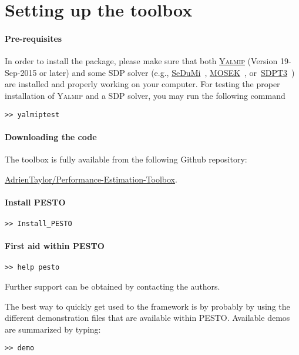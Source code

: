 \documentclass[11pt,a4paper]{article}
\newcommand{\pesto}{{PESTO }}
\begin{document}
\clearpage
\section{Setting up the toolbox}		%


\paragraph{Pre-requisites} In order to install the package, please make sure that both \href{https://yalmip.github.io/}{\textsc{Yalmip}} (Version 19-Sep-2015 or later) and some SDP solver (e.g., \href{http://sedumi.ie.lehigh.edu/}{SeDuMi}~\cite{Article:Sedumi}, \href{https://mosek.com/}{MOSEK}~\cite{Article:Mosek}, or~\href{http://www.math.nus.edu.sg/~mattohkc/sdpt3.html}{SDPT3}~\cite{Article:sdpt3}) are installed and properly working on your computer. For testing the proper installation of \textsc{Yalmip} and a SDP solver, you may run the following command
\begin{verbatim}
>> yalmiptest
\end{verbatim}
\paragraph{Downloading the code} The toolbox is fully available from the following {\sc Github} repository: \begin{center}
\href{https://github.com/AdrienTaylor/Performance-Estimation-Toolbox}{\sc AdrienTaylor/Performance-Estimation-Toolbox}.\\
\end{center}

\paragraph{Install \pesto}
\begin{verbatim}
>> Install_PESTO
\end{verbatim}

\paragraph{First aid within \pesto}
\begin{verbatim}
>> help pesto
\end{verbatim}
Further support can be obtained by contacting the authors.

The best way to quickly get used to the framework is by probably by using the different demonstration files that are available within PESTO. Available demos are summarized by typing:
\begin{verbatim}
>> demo
\end{verbatim}
\end{document}
